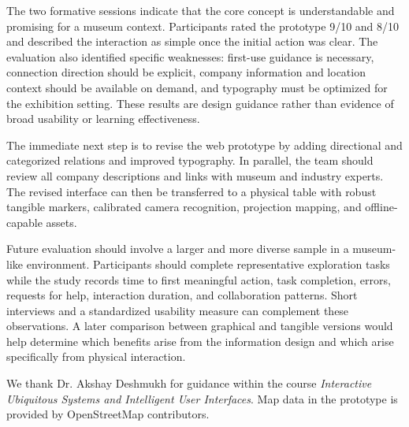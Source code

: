 \documentclass[sigconf,nonacm]{acmart}
\begin{document}
The two formative sessions indicate that the core concept is understandable and promising for a museum context. Participants rated the prototype 9/10 and 8/10 and described the interaction as simple once the initial action was clear. The evaluation also identified specific weaknesses: first-use guidance is necessary, connection direction should be explicit, company information and location context should be available on demand, and typography must be optimized for the exhibition setting. These results are design guidance rather than evidence of broad usability or learning effectiveness.

The immediate next step is to revise the web prototype by adding directional and categorized relations and improved typography. In parallel, the team should review all company descriptions and links with museum and industry experts. The revised interface can then be transferred to a physical table with robust tangible markers, calibrated camera recognition, projection mapping, and offline-capable assets.

Future evaluation should involve a larger and more diverse sample in a museum-like environment. Participants should complete representative exploration tasks while the study records time to first meaningful action, task completion, errors, requests for help, interaction duration, and collaboration patterns. Short interviews and a standardized usability measure can complement these observations. A later comparison between graphical and tangible versions would help determine which benefits arise from the information design and which arise specifically from physical interaction.

\begin{acks}
We thank Dr. Akshay Deshmukh for guidance within the course \emph{Interactive Ubiquitous Systems and Intelligent User Interfaces}. Map data in the prototype is provided by OpenStreetMap contributors.
\end{acks}



\end{document}
